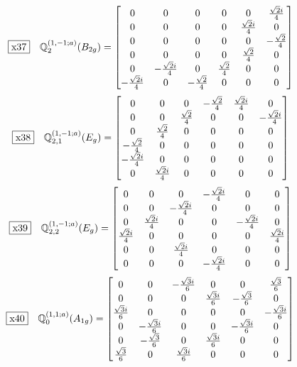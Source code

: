 \documentclass[fleqn,10pt,landscape]{jsarticle}
\begin{document}
\begin{dmath*}
\fbox{x37}\quad \mathbb{Q}_{2}^{(1,-1;a)}(B_{2g})=\begin{bmatrix} 0 & 0 & 0 & 0 & 0 & \frac{\sqrt{2} i}{4} \\ 0 & 0 & 0 & 0 & \frac{\sqrt{2} i}{4} & 0 \\ 0 & 0 & 0 & 0 & 0 & - \frac{\sqrt{2}}{4} \\ 0 & 0 & 0 & 0 & \frac{\sqrt{2}}{4} & 0 \\ 0 & - \frac{\sqrt{2} i}{4} & 0 & \frac{\sqrt{2}}{4} & 0 & 0 \\ - \frac{\sqrt{2} i}{4} & 0 & - \frac{\sqrt{2}}{4} & 0 & 0 & 0 \end{bmatrix}
\end{dmath*}
\begin{dmath*}
\fbox{x38}\quad \mathbb{Q}_{2,1}^{(1,-1;a)}(E_{g})=\begin{bmatrix} 0 & 0 & 0 & - \frac{\sqrt{2}}{4} & \frac{\sqrt{2} i}{4} & 0 \\ 0 & 0 & \frac{\sqrt{2}}{4} & 0 & 0 & - \frac{\sqrt{2} i}{4} \\ 0 & \frac{\sqrt{2}}{4} & 0 & 0 & 0 & 0 \\ - \frac{\sqrt{2}}{4} & 0 & 0 & 0 & 0 & 0 \\ - \frac{\sqrt{2} i}{4} & 0 & 0 & 0 & 0 & 0 \\ 0 & \frac{\sqrt{2} i}{4} & 0 & 0 & 0 & 0 \end{bmatrix}
\end{dmath*}
\begin{dmath*}
\fbox{x39}\quad \mathbb{Q}_{2,2}^{(1,-1;a)}(E_{g})=\begin{bmatrix} 0 & 0 & 0 & - \frac{\sqrt{2} i}{4} & 0 & 0 \\ 0 & 0 & - \frac{\sqrt{2} i}{4} & 0 & 0 & 0 \\ 0 & \frac{\sqrt{2} i}{4} & 0 & 0 & - \frac{\sqrt{2} i}{4} & 0 \\ \frac{\sqrt{2} i}{4} & 0 & 0 & 0 & 0 & \frac{\sqrt{2} i}{4} \\ 0 & 0 & \frac{\sqrt{2} i}{4} & 0 & 0 & 0 \\ 0 & 0 & 0 & - \frac{\sqrt{2} i}{4} & 0 & 0 \end{bmatrix}
\end{dmath*}
\begin{dmath*}
\fbox{x40}\quad \mathbb{Q}_{0}^{(1,1;a)}(A_{1g})=\begin{bmatrix} 0 & 0 & - \frac{\sqrt{3} i}{6} & 0 & 0 & \frac{\sqrt{3}}{6} \\ 0 & 0 & 0 & \frac{\sqrt{3} i}{6} & - \frac{\sqrt{3}}{6} & 0 \\ \frac{\sqrt{3} i}{6} & 0 & 0 & 0 & 0 & - \frac{\sqrt{3} i}{6} \\ 0 & - \frac{\sqrt{3} i}{6} & 0 & 0 & - \frac{\sqrt{3} i}{6} & 0 \\ 0 & - \frac{\sqrt{3}}{6} & 0 & \frac{\sqrt{3} i}{6} & 0 & 0 \\ \frac{\sqrt{3}}{6} & 0 & \frac{\sqrt{3} i}{6} & 0 & 0 & 0 \end{bmatrix}
\end{dmath*}
\end{document}
